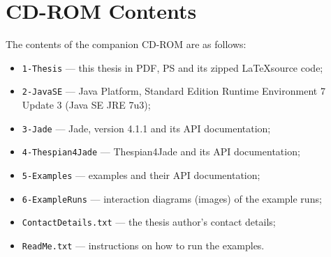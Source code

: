 
\chapter{CD-ROM Contents}

The contents of the companion CD-ROM are as follows:

\begin{itemize}
	\item \texttt{1-Thesis} --- this thesis in PDF, PS and its zipped \LaTeX source code;
	\item \texttt{2-JavaSE} --- Java Platform, Standard Edition Runtime Environment 7 Update 3 (Java SE JRE 7u3);
	\item \texttt{3-Jade} --- Jade, version 4.1.1 and its API documentation;
	\item \texttt{4-Thespian4Jade} --- Thespian4Jade and its API documentation;
	\item \texttt{5-Examples} --- examples and their API documentation;
	\item \texttt{6-ExampleRuns} --- interaction diagrams (images) of the example runs;
	\item \texttt{ContactDetails.txt} --- the thesis author's contact details;
	\item \texttt{ReadMe.txt} --- instructions on how to run the examples.
\end{itemize}